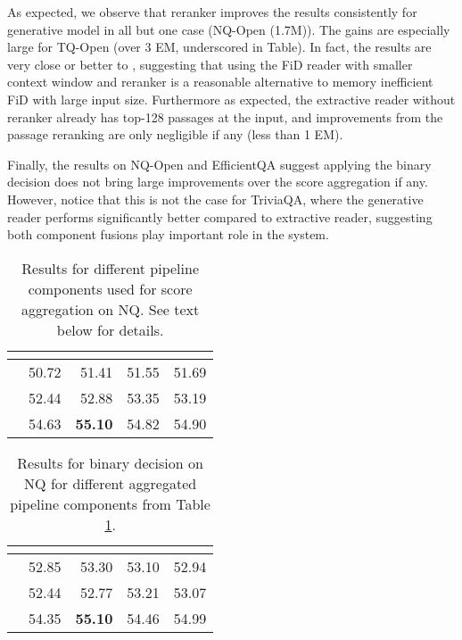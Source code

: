 \documentclass[11pt,a4paper]{article}
\begin{document}
\begin{description}[style=unboxed,leftmargin=0em,listparindent=\parindent]
As expected, we observe that reranker improves the results consistently for generative model in all but one case (NQ-Open (1.7M)). 
The gains are especially large for TQ-Open (over 3 EM, underscored in Table). 
In fact, the results are very close or better to \citet{izacard2020leveraging}, suggesting that using the FiD reader with smaller context window and reranker is a reasonable alternative to memory inefficient FiD with large input size.
Furthermore as expected, the extractive reader without reranker already has top-128 passages at the input, and improvements from the passage reranking are only negligible if any (less than 1 EM).

Finally, the results on NQ-Open and EfficientQA suggest applying the binary decision does not bring large improvements over the score aggregation if any. 
However, notice that this is not the case for TriviaQA, where the generative reader performs significantly better compared to extractive reader, suggesting both component fusions play important role in the system.


\begin{table}[ht]
    \centering
    \begin{tabular}{crrrr}
\toprule
 & \multicolumn{1}{c}{} & \multicolumn{1}{c}{} & \multicolumn{1}{c}{} & \multicolumn{1}{c}{} \\ \midrule
   & 50.72 & 51.41          & 51.55 & 51.69 \\
   & 52.44 & 52.88          & 53.35 & 53.19 \\
 & 54.63 & \textbf{55.10} & 54.82 & 54.90 \\ \bottomrule
\end{tabular}     \caption{Results for different pipeline components used for score aggregation on NQ. See text below for details.}
    \label{tab:score-aggr}
\end{table}
\begin{table}[ht]
    \centering
    \begin{tabular}{crrrr}
\toprule
 & \multicolumn{1}{c}{} & \multicolumn{1}{c}{} & \multicolumn{1}{c}{} & \multicolumn{1}{c}{} \\ \midrule
   & 52.85 & 53.30          & 53.10 & 52.94 \\
   & 52.44 & 52.77          & 53.21 & 53.07 \\
 & 54.35 & \textbf{55.10} & 54.46 & 54.99 \\ \bottomrule
\end{tabular}     \caption{Results for binary decision on NQ for different aggregated pipeline components from Table \ref{tab:score-aggr}.}
    \label{tab:binary-decision}
\end{table}


\end{description}
\end{document}
